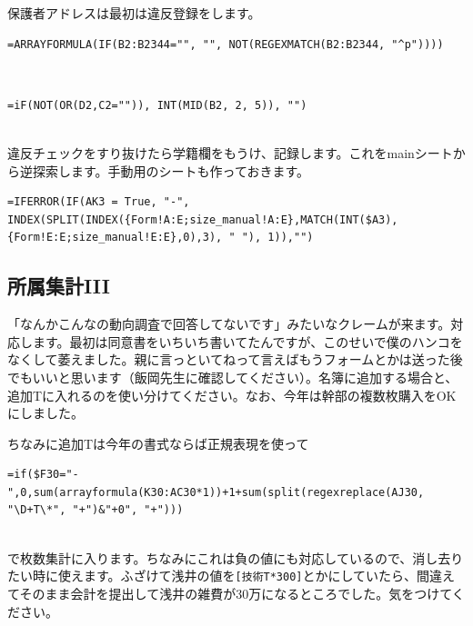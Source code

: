 \documentclass[dvipdfmx,jb5]{jreport}
\begin{document}
保護者アドレスは最初は違反登録をします。
\\
\begin{lstlisting}
=ARRAYFORMULA(IF(B2:B2344="", "", NOT(REGEXMATCH(B2:B2344, "^p"))))
\end{lstlisting}
\\
\begin{lstlisting}
=iF(NOT(OR(D2,C2="")), INT(MID(B2, 2, 5)), "")
\end{lstlisting}
\\
違反チェックをすり抜けたら学籍欄をもうけ、記録します。これをmainシートから逆探索します。手動用のシートも作っておきます。
\\
\begin{lstlisting}
=IFERROR(IF(AK3 = True, "-", INDEX(SPLIT(INDEX({Form!A:E;size_manual!A:E},MATCH(INT($A3),{Form!E:E;size_manual!E:E},0),3), " "), 1)),"")
\end{lstlisting}

\subsection{所属集計III}
「なんかこんなの動向調査で回答してないです」みたいなクレームが来ます。対応します。最初は同意書をいちいち書いてたんですが、このせいで僕のハンコをなくして萎えました。親に言っといてねって言えばもうフォームとかは送った後でもいいと思います（飯岡先生に確認してください）。名簿に追加する場合と、追加Tに入れるのを使い分けてください。なお、今年は幹部の複数枚購入をOKにしました。

ちなみに追加Tは今年の書式ならば正規表現を使って
\\
\begin{lstlisting}
=if($F30="-",0,sum(arrayformula(K30:AC30*1))+1+sum(split(regexreplace(AJ30, "\D+T\*", "+")&"+0", "+")))
\end{lstlisting}
\\
で枚数集計に入ります。ちなみにこれは負の値にも対応しているので、消し去りたい時に使えます。ふざけて浅井の値を\texttt{[技術T*300]}とかにしていたら、間違えてそのまま会計を提出して浅井の雑費が30万になるところでした。気をつけてください。
\end{document}

